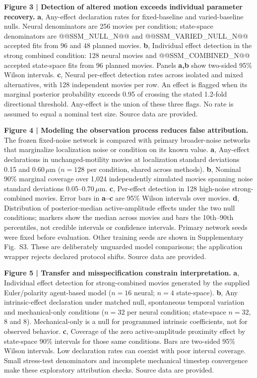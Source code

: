 \documentclass[12pt]{article}
\begin{document}
\textbf{Figure 3 | Detection of altered motion exceeds individual parameter recovery.}
\textbf{a}, Any-effect declaration rates for fixed-baseline and varied-baseline nulls. Neural denominators are 256 movies per condition; state-space denominators are @@SSM_NULL_N@@ and @@SSM_VARIED_NULL_N@@ accepted fits from 96 and 48 planned movies. \textbf{b}, Individual effect detection in the strong combined condition: 128 neural movies and @@SSM_COMBINED_N@@ accepted state-space fits from 96 planned movies. Panels \textbf{a,b} show two-sided 95\% Wilson intervals. \textbf{c}, Neural per-effect detection rates across isolated and mixed alternatives, with 128 independent movies per row. An effect is flagged when its marginal posterior probability exceeds 0.95 of crossing the stated 1.2-fold directional threshold. Any-effect is the union of these three flags. No rate is assumed to equal a nominal test size. Source data are provided.

\textbf{Figure 4 | Modeling the observation process reduces false attribution.}
The frozen fixed-noise network is compared with primary broader-noise networks that marginalize localization noise or condition on its known value. \textbf{a}, Any-effect declarations in unchanged-motility movies at localization standard deviations 0.15 and 0.60\,$\mu$m ($n=128$ per condition, shared across methods). \textbf{b}, Nominal 90\% marginal coverage over 1,024 independently simulated movies spanning noise standard deviations 0.05--0.70\,$\mu$m. \textbf{c}, Per-effect detection in 128 high-noise strong-combined movies. Error bars in \textbf{a--c} are 95\% Wilson intervals over movies. \textbf{d}, Distribution of posterior-median active-amplitude effects under the two null conditions; markers show the median across movies and bars the 10th--90th percentiles, not credible intervals or confidence intervals. Primary network seeds were fixed before evaluation. Other training seeds are shown in Supplementary Fig.~S3. These are deliberately unguarded model comparisons; the application wrapper rejects declared protocol shifts. Source data are provided.

\textbf{Figure 5 | Transfer and misspecification constrain interpretation.}
\textbf{a}, Individual effect detection for strong-combined movies generated by the supplied Euler/polarity agent-based model ($n=16$ neural; $n=4$ state-space). \textbf{b}, Any intrinsic-effect declaration under matched null, spontaneous temporal variation and mechanical-only conditions ($n=32$ per neural condition; state-space $n=32$, 8 and 8). Mechanical-only is a null for programmed intrinsic coefficients, not for observed behavior. \textbf{c}, Coverage of the zero active-amplitude proximity effect by state-space 90\% intervals for those same conditions. Bars are two-sided 95\% Wilson intervals. Low declaration rates can coexist with poor interval coverage. Small stress-test denominators and incomplete mechanical timestep convergence make these exploratory attribution checks. Source data are provided.
\end{document}
